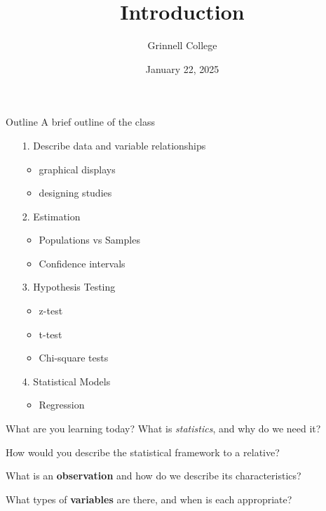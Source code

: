 \documentclass{beamer}
\title[SST-115 / STA-209]{Introduction}
\subtitle{}
\author{Grinnell College}
\date{January 22, 2025}
\begin{document}
\begin{frame}
  \titlepage
\end{frame}

\begin{frame}{Outline} 
A brief outline of the class \vspace{2mm}

\begin{enumerate}
\item[1.] Describe data and variable relationships
	\begin{itemize}
	\item graphical displays
	\item designing studies
	\end{itemize}
\item[2.] Estimation
	\begin{itemize}
	\item Populations vs Samples
	\item Confidence intervals
	\end{itemize}
\item[3.] Hypothesis Testing
	\begin{itemize}
	\item z-test
	\item t-test
	\item Chi-square tests
	\end{itemize}
\item[4.] Statistical Models
	\begin{itemize}
	\item Regression
	\end{itemize}
\end{enumerate}

\end{frame}

\begin{frame}{What are you learning today?}
What is \textit{statistics}, and why do we need it? \vspace{3mm}

How would you describe the statistical framework to a relative? \vspace{3mm}

What is an \textbf{observation} and how do we describe its characteristics? \vspace{3mm}

What types of \textbf{variables} are there, and when is each appropriate?

\end{frame}
\end{document}
